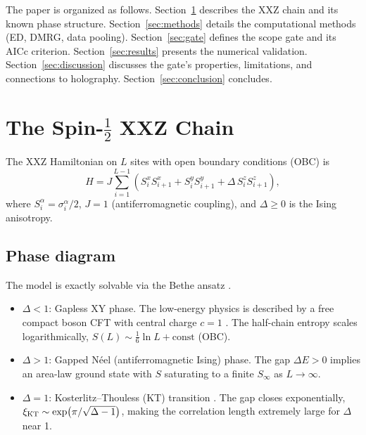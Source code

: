 \documentclass[11pt,letterpaper]{article}
\newcommand{\Sinf}{S_{\infty}}
\newcommand{\Neel}{N\'{e}el}
\begin{document}
The paper is organized as follows.  Section~\ref{sec:model} describes the
XXZ chain and its known phase structure.  Section~\ref{sec:methods} details
the computational methods (ED, DMRG, data pooling).  Section~\ref{sec:gate}
defines the scope gate and its AICc criterion.  Section~\ref{sec:results}
presents the numerical validation.  Section~\ref{sec:discussion} discusses
the gate's properties, limitations, and connections to holography.
Section~\ref{sec:conclusion} concludes.

\section{The Spin-$\tfrac{1}{2}$ XXZ Chain}
\label{sec:model}

The XXZ Hamiltonian on $L$ sites with open boundary conditions (OBC) is
\begin{equation}
  H = J\sum_{i=1}^{L-1}
      \left(S^x_i S^x_{i+1} + S^y_i S^y_{i+1} + \Delta\, S^z_i S^z_{i+1}\right),
  \label{eq:xxz}
\end{equation}
where $S^\alpha_i = \sigma^\alpha_i/2$, $J = 1$ (antiferromagnetic
coupling), and $\Delta \ge 0$ is the Ising anisotropy.

\subsection*{Phase diagram}

The model is exactly solvable via the Bethe ansatz \cite{Bethe1931}.
\begin{itemize}
  \item $\Delta < 1$: Gapless XY phase.  The low-energy physics is described
    by a free compact boson CFT with central charge $c = 1$
    \cite{Lukyanov1997}.  The half-chain entropy scales logarithmically,
    $S(L) \sim \frac{1}{6}\ln L + \text{const}$ (OBC).
  \item $\Delta > 1$: Gapped \Neel{} (antiferromagnetic Ising) phase.
    The gap $\Delta E > 0$ implies an area-law ground state with $S$ saturating
    to a finite $\Sinf$ as $L\to\infty$.
  \item $\Delta = 1$: Kosterlitz–Thouless (KT) transition
    \cite{KT1972,KT1973}.  The gap closes exponentially,
    $\xi_{\rm KT} \sim \exp\!\left(\pi/\sqrt{\Delta - 1}\right)$, making the
    correlation length extremely large for $\Delta$ near 1.
\end{itemize}
\end{document}
